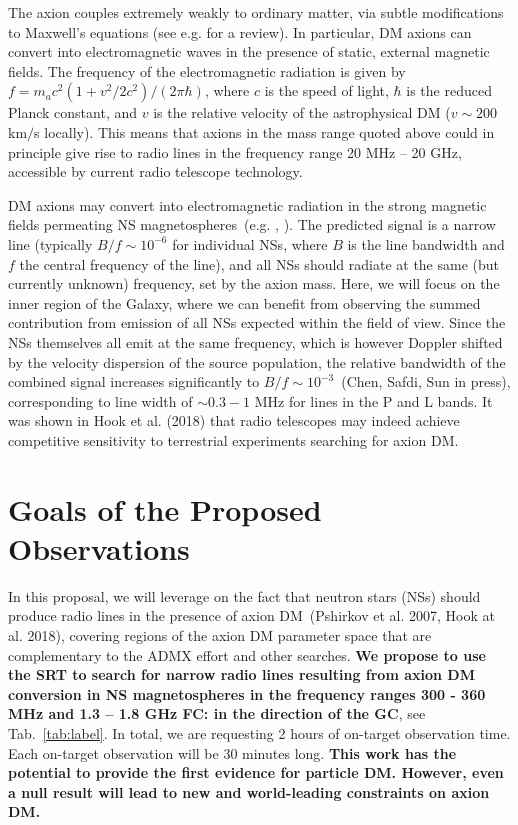 \documentclass[a4paper, 11pt]{article}
\newcommand{\FC}[1]{\textbf{\color{purple} FC: #1}}
\begin{document}
The axion couples extremely weakly to ordinary matter, via  subtle modifications to Maxwell's equations (see e.g. \cite{Graham:2015ouw} for a review).  In particular, DM axions can convert into electromagnetic waves in the presence of static, external magnetic fields.  The frequency of the electromagnetic radiation is given by $f = m_a c^2 (1 + v^2 / 2 c^2) / (2 \pi \hbar)$, where $c$ is the speed of light, $\hbar$ is the reduced Planck constant, and $v$ is the relative velocity of the astrophysical DM ($v \sim 200$ km$/$s locally).  This means that axions in the mass range quoted above could in principle give rise to radio lines in the frequency range 20 MHz -- 20 GHz, accessible by current radio telescope technology.

DM axions may convert into electromagnetic radiation in the strong magnetic fields permeating NS magnetospheres~(e.g. \cite{Pshirkov:2007st}, \cite{Hook:2018iia}).  The predicted signal is a narrow line (typically $B / f \sim 10^{-6}$ for individual NSs, where $B$ is the line bandwidth and $f$ the central frequency of the line), and all NSs should radiate at the same (but currently unknown) frequency, set by the axion mass.   Here, we will focus on the inner region of the Galaxy, where we can benefit from observing the summed contribution from emission of all NSs expected within the field of view.  Since the NSs themselves all emit at the same frequency, which is however Doppler shifted by the velocity dispersion of the source population, the relative bandwidth of the combined signal increases significantly to $B /f \sim 10^{-3}$~(Chen, Safdi, Sun in press), corresponding to line width of $\sim 0.3-1$ MHz for lines in the P and L bands. It was shown in Hook et al. (2018) that radio telescopes may indeed achieve competitive sensitivity to terrestrial experiments searching for axion DM.


\section*{Goals of the Proposed Observations}

In this proposal, we will leverage on the fact that neutron stars (NSs) should produce radio lines in the presence of axion DM~(Pshirkov et al. 2007, Hook at al. 2018), covering regions of the axion DM parameter space that are complementary to the ADMX effort and other searches.   \textbf{We propose to use the SRT to search for narrow radio lines resulting from axion DM conversion in NS magnetospheres in the frequency ranges 300 - 360 MHz and 1.3 -- 1.8 GHz \FC{in the direction of the GC}}, see Tab.~\ref{tab:label}.  In total, we are requesting 2 hours of on-target observation time.  Each on-target observation will be 30 minutes long.   \textbf{This work has the potential to provide the first evidence for particle DM.  However, even a null result will lead to new and world-leading constraints on axion DM.} 
\end{document}
